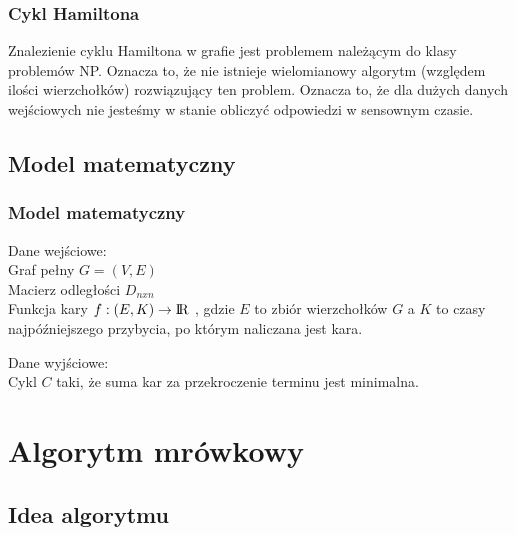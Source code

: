\documentclass{beamer}
\begin{document}
\begin{frame}
\frametitle{Cykl Hamiltona}
Znalezienie cyklu Hamiltona w grafie jest problemem należącym do klasy problemów NP.
Oznacza to, że nie istnieje wielomianowy algorytm (względem ilości wierzchołków) rozwiązujący ten problem. Oznacza to, że dla dużych danych wejściowych nie jesteśmy w stanie obliczyć odpowiedzi w sensownym czasie.

\end{frame}

\subsection{Model matematyczny}
\begin{frame}
\frametitle{Model matematyczny}
Dane wejściowe: \\
Graf pełny $G=(V,E)$  \\
Macierz odległości $D_{nxn}$ \\
Funkcja kary $ f : (E,K) \rightarrow {\rm I\!R} $ , gdzie $E$ to zbiór wierzchołków $G$ a $K$ to czasy najpóźniejszego przybycia, po którym naliczana jest kara.

Dane wyjściowe: \\
Cykl $C$ taki, że suma kar za przekroczenie terminu jest minimalna.
\end{frame}





\section{Algorytm mrówkowy}

\subsection{Idea algorytmu}
\end{document}
